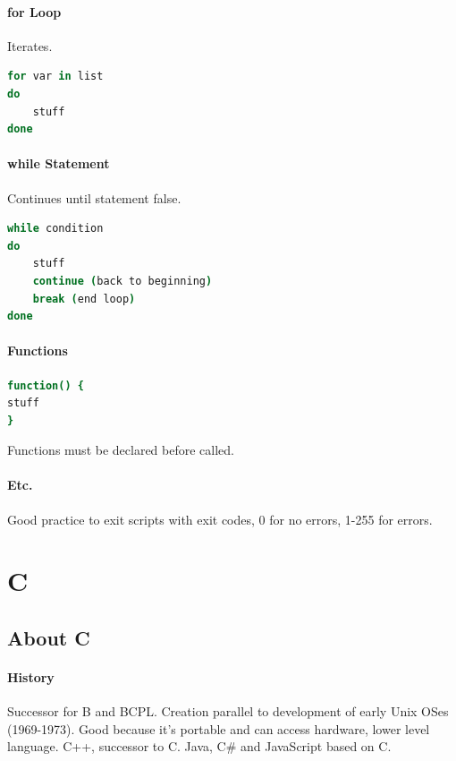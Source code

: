 \documentclass[12 pt]{article}
\begin{document}
\paragraph{for Loop} Iterates.
\begin{lstlisting}[language=bash]
for var in list
do
	stuff
done
\end{lstlisting}
\paragraph{while Statement} Continues until statement false.
\begin{lstlisting}[language=bash]
while condition
do
	stuff
	continue (back to beginning)
	break (end loop)
done
\end{lstlisting}
\paragraph{Functions}
\begin{lstlisting}[language=bash]
function() {
stuff
}
\end{lstlisting}
Functions must be declared before called.  

\paragraph{Etc.}
Good practice to exit scripts with exit codes, 0 for no errors, 1-255 for errors.
\section{C}
\subsection{About C}
\paragraph{History}
Successor for B and BCPL. Creation parallel to development of early Unix OSes (1969-1973). Good because it's portable and can access hardware, lower level language. C++, successor to C. Java, C\# and JavaScript based on C. 
\end{document}
